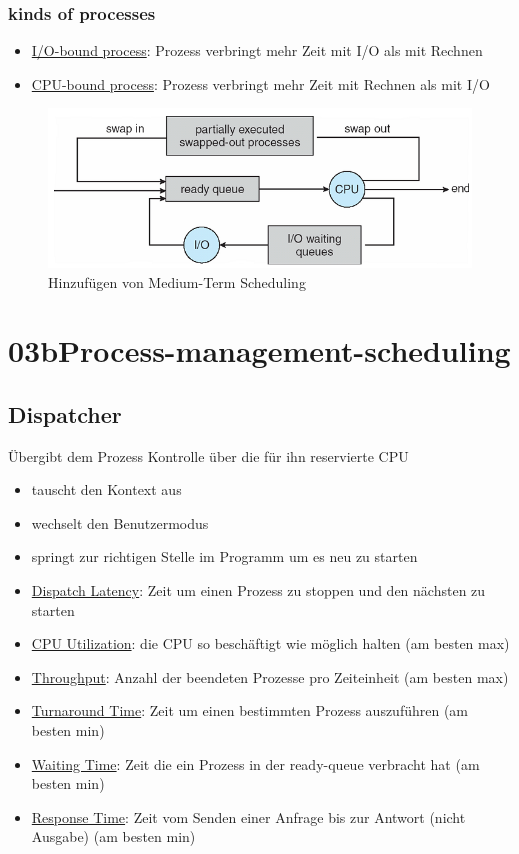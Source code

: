 \documentclass[a4paper]{scrreprt}
\begin{document}
\subsection{kinds of processes}
\begin{itemize}
\item \underline{I/O-bound process}: Prozess verbringt mehr Zeit mit I/O als mit Rechnen
\item \underline{CPU-bound process}: Prozess verbringt mehr Zeit mit Rechnen als mit I/O
\end{itemize}
\begin{figure}[t]
\includegraphics[scale = 0.5]{graphics/medium_scheduling.png}
\caption{Hinzufügen von Medium-Term Scheduling}
\end{figure}
\chapter{03bProcess-management-scheduling}
\section{Dispatcher}
Übergibt dem Prozess Kontrolle über die für ihn reservierte CPU
\begin{itemize}
\item tauscht den Kontext aus
\item wechselt den Benutzermodus
\item springt zur richtigen Stelle im Programm um es neu zu starten
\end{itemize}
\begin{itemize}
\item \underline{Dispatch Latency}: Zeit um einen Prozess zu stoppen und den nächsten zu starten
\item \underline{CPU Utilization}: die CPU so beschäftigt wie möglich halten (am besten max)
\item \underline{Throughput}: Anzahl der beendeten Prozesse pro Zeiteinheit (am besten max)
\item \underline{Turnaround Time}: Zeit um einen bestimmten Prozess auszuführen (am besten min)
\item \underline{Waiting Time}: Zeit die ein Prozess in der ready-queue verbracht hat (am besten min)
\item \underline{Response Time}: Zeit vom Senden einer Anfrage bis zur Antwort (nicht Ausgabe) (am besten min)
\end{itemize}
\end{document}
